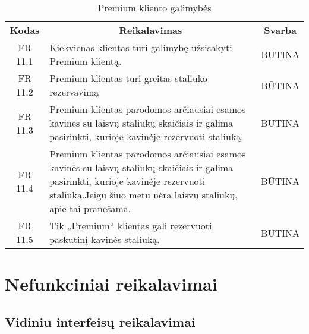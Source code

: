 \documentclass{VUMIFPSkursinis}
\begin{document}
\begin{center}
	\begin{table}[H]
	\begin{tabular}{|p{2cm}|p{}|p{}|}
	\hline
	    \rowcolor{lightgray}
		\multicolumn{3}{|c|}{Premium kliento galimybės}\\
		
	\hline
		\multicolumn{1}{|c|}{{\bfseries Kodas}}&
		\multicolumn{1}{|c|}{{\bfseries Reikalavimas}}&
		\multicolumn{1}{|c|}{{\bfseries Svarba}}\\
	\hline 	
		\multicolumn{1}{|c|}{FR 11.1}&
		{Kiekvienas klientas turi galimybę užsisakyti Premium klientą.}&
		\multicolumn{1}{|c|}{BŪTINA}\\
				
	\hline 	
		\multicolumn{1}{|c|}{FR 11.2}&
		{Premium klientas turi greitas staliuko rezervavimą}&
		\multicolumn{1}{|c|}{BŪTINA}\\
				
	\hline 	
		\multicolumn{1}{|c|}{FR 11.3}&
		{Premium klientas parodomos arčiausiai esamos kavinės su laisvų staliukų skaičiais ir galima pasirinkti, kurioje kavinėje rezervuoti staliuką.}&
		\multicolumn{1}{|c|}{BŪTINA}\\
				
	\hline 	
		\multicolumn{1}{|c|}{FR 11.4}&
		{Premium klientas parodomos arčiausiai esamos kavinės su laisvų staliukų skaičiais ir galima pasirinkti, kurioje kavinėje rezervuoti staliuką.Jeigu šiuo metu nėra laisvų staliukų, apie tai pranešama.}&
		\multicolumn{1}{|c|}{BŪTINA}\\
				
	\hline 	
		\multicolumn{1}{|c|}{FR 11.5}&
		{Tik „Premium“ klientas gali rezervuoti paskutinį kavinės staliuką.}&
		\multicolumn{1}{|c|}{BŪTINA}\\
				
	\hline

	\end{tabular}
	\caption{Premium kliento galimybės}
	\label{table:Premiumklientogalimybės}		
	\end{table}

\end{center}

\pagebreak
\section{Nefunkciniai reikalavimai}

\subsection{Vidiniu interfeisų reikalavimai}
\end{document}
